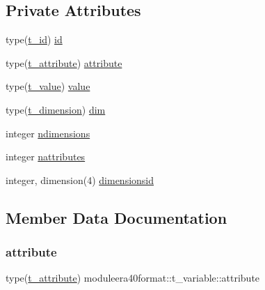\subsection*{Private Attributes}
\begin{DoxyCompactItemize}
\item 
type(\mbox{\hyperlink{structmoduleera40format_1_1t__id}{t\+\_\+id}}) \mbox{\hyperlink{structmoduleera40format_1_1t__variable_ae6c7c64390ce517da3af91d8e4d3b1c0}{id}}
\item 
type(\mbox{\hyperlink{structmoduleera40format_1_1t__attribute}{t\+\_\+attribute}}) \mbox{\hyperlink{structmoduleera40format_1_1t__variable_ab8641fe338ad8e4ef48791d668cf8856}{attribute}}
\item 
type(\mbox{\hyperlink{structmoduleera40format_1_1t__value}{t\+\_\+value}}) \mbox{\hyperlink{structmoduleera40format_1_1t__variable_a9f5250755984d884c7abec1b944ba6f2}{value}}
\item 
type(\mbox{\hyperlink{structmoduleera40format_1_1t__dimension}{t\+\_\+dimension}}) \mbox{\hyperlink{structmoduleera40format_1_1t__variable_a3a95b73bfcb985a3966ab783468e595f}{dim}}
\item 
integer \mbox{\hyperlink{structmoduleera40format_1_1t__variable_ae017b9f4d719564753b38d69d9eb33db}{ndimensions}}
\item 
integer \mbox{\hyperlink{structmoduleera40format_1_1t__variable_a33372593afe9fb6743433b90302782b9}{nattributes}}
\item 
integer, dimension(4) \mbox{\hyperlink{structmoduleera40format_1_1t__variable_a70255eaac898e8fdc23c21b53689d32a}{dimensionsid}}
\end{DoxyCompactItemize}


\subsection{Member Data Documentation}
\mbox{\label{structmoduleera40format_1_1t__variable_ab8641fe338ad8e4ef48791d668cf8856}} 
\subsubsection{\texorpdfstring{attribute}{attribute}}
{\footnotesize\ttfamily type(\mbox{\hyperlink{structmoduleera40format_1_1t__attribute}{t\+\_\+attribute}}) moduleera40format\+::t\+\_\+variable\+::attribute\hspace{0.3cm}{\ttfamily [private]}}

